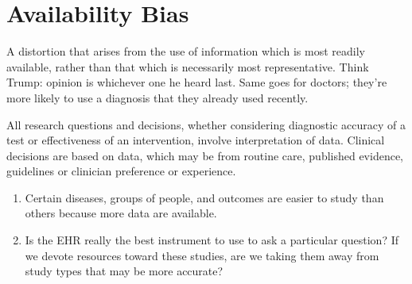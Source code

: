 
\section{Availability Bias}

A distortion that arises from the use of information which is most readily available, rather than that which is necessarily most representative. Think Trump: opinion is whichever one he heard last. Same goes for doctors; they're more likely to use a diagnosis that they already used recently. 

All research questions and decisions, whether considering diagnostic accuracy of a test or effectiveness of an intervention, involve interpretation of data. Clinical decisions are based on data, which may be from routine care, published evidence, guidelines or clinician preference or experience.

\begin{enumerate}
\item Certain diseases, groups of people, and outcomes are easier to study than others because more data are available. 
\item Is the EHR really the best instrument to use to ask a particular question? If we devote resources toward these studies, are we taking them away from study types that may be more accurate?


\end{enumerate}


